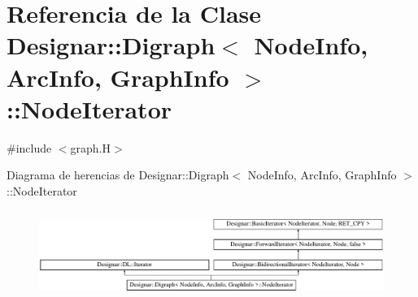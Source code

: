 \hypertarget{class_designar_1_1_digraph_1_1_node_iterator}{}\section{Referencia de la Clase Designar\+:\+:Digraph$<$ Node\+Info, Arc\+Info, Graph\+Info $>$\+:\+:Node\+Iterator}
\label{class_designar_1_1_digraph_1_1_node_iterator}


{\ttfamily \#include $<$graph.\+H$>$}

Diagrama de herencias de Designar\+:\+:Digraph$<$ Node\+Info, Arc\+Info, Graph\+Info $>$\+:\+:Node\+Iterator\begin{figure}[H]
\begin{center}
\leavevmode
\includegraphics[height=2.879177cm]{class_designar_1_1_digraph_1_1_node_iterator}
\end{center}
\end{figure}
